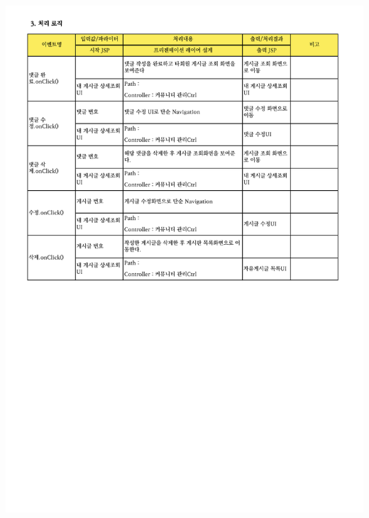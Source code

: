 {{{{{{{{{{{{{{{{{{{{{{{{{{{{{{{{{{{{{{{{{{{{{{{{{{{{{\includegraphics[width=20cm]{./Figure/Analysis/Display/community/community_12.pdf} \\
}}}}}}}}}}}}}}}}}}}}}}}}}}}}}}}}}}}}}}}}}}}}}}}}}}}}}
